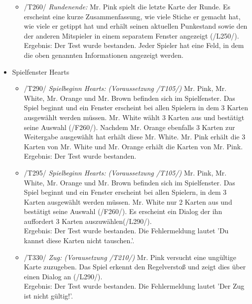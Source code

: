\documentclass[a4paper]{article}
\begin{document}
\begin{itemize}
\begin{itemize}
		\item /T260/ \textit{Rundenende:} Mr. Pink spielt die letzte Karte der Runde. Es erscheint eine kurze 					Zusammenfassung, wie viele Stiche er gemacht hat, wie viele er getippt hat und erhält seinen aktuellen Punkestand 			sowie den der anderen Mitspieler in einem separatem Fenster angezeigt (/L250/). \\
		Ergebnis: Der Test wurde bestanden. Jeder Spieler hat eine Feld, in dem die oben genannten Informationen 				angezeigt werden. 
					
	\end{itemize}
	
	\item Spielfenster Hearts
	\begin{itemize}
	
		\item /T290/ \textit{Spielbeginn Hearts: (Voraussetzung /T105/)} Mr. Pink, Mr. White, Mr. Orange und Mr. Brown 				befinden sich im Spielfenster. Das Spiel beginnt und ein Fenster erscheint bei allen Spielern in dem 3 Karten 				ausgewählt werden müssen. Mr. White wählt 3 Karten aus und bestätigt seine Auswahl (/F260/). Nachdem Mr. 				Orange ebenfalls 3 Karten zur Weitergabe ausgewählt hat erhält diese Mr. White. Mr. Pink erhält die 3 Karten von 			Mr. White und  Mr. Orange erhält die Karten von Mr. Pink. \\
		Ergebnis: Der Test wurde bestanden.

		\item /T295/ \textit{Spielbeginn Hearts: (Voraussetzung /T105/)} Mr. Pink, Mr. White, Mr. Orange und Mr. Brown 				befinden sich im Spielfenster. Das Spiel beginnt und ein Fenster erscheint bei allen Spielern, in dem 3 Karten 				ausgewählt werden müssen. Mr. White nur 2 Karten aus und bestätigt seine Auswahl (/F260/). Es erscheint ein 				Dialog der ihn auffordert 3 Karten auszuwählen(/L290/). \\
		Ergebnis: Der Test wurde bestanden. Die Fehlermeldung lautet 'Du kannst diese Karten nicht tauschen.'.

		\item /T330/ \textit{Zug: (Vorausetzung /T210/)} Mr. Pink versucht eine ungültige Karte zuzugeben. Das Spiel 				erkennt den Regelverstoß und zeigt dies über einen Dialog an (/L290/). \\
		Ergebnis: Der Test wurde bestanden. Die Fehlermeldung lautet 'Der Zug ist nicht gültig!'.
		
	\end{itemize}
\end{itemize}
\end{document}
